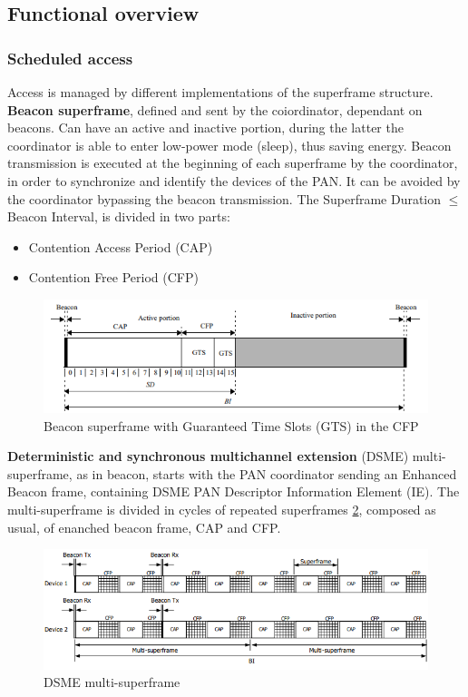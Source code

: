 \documentclass[conference]{IEEEtran}
\begin{document}
\subsection{Functional overview}
\subsubsection{Scheduled access}
Access is managed by different implementations of the superframe structure.\\
\textbf{Beacon superframe}, defined and sent by the coiordinator, dependant on beacons.
Can have an active and inactive portion, during the latter the coordinator is able
to enter low-power mode (sleep), thus saving energy.
Beacon transmission is executed at the beginning of each superframe by the coordinator,
in order to synchronize and identify the devices of the PAN. It can be avoided by the
coordinator bypassing the beacon transmission.
The Superframe Duration $\le$ Beacon Interval, is divided in two parts:
\begin{itemize}
    \item Contention Access Period (CAP)
    \item Contention Free Period (CFP)
\end{itemize}

\begin{figure}[!h]
    \centering
    \includegraphics[width=1\linewidth]{superframe}
    \caption{Beacon superframe with Guaranteed Time Slots (GTS) in the CFP}
    \label{fig:superframe}
\end{figure}

\textbf{Deterministic and synchronous multichannel extension} (DSME) multi-superframe, as 
in beacon, starts with the PAN coordinator sending an Enhanced Beacon frame, containing
DSME PAN Descriptor Information Element (IE). The multi-superframe is divided in
cycles of repeated superframes \ref{fig:multi-superframe}, composed as usual, 
of enanched beacon frame, CAP and CFP.\\

\begin{figure}[!h]
    \centering
    \includegraphics[width=1\linewidth]{DSME}
    \caption{DSME multi-superframe}
    \label{fig:multi-superframe}
\end{figure}
\end{document}
